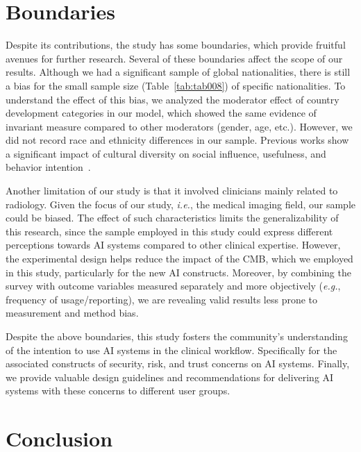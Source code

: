 \section{Boundaries}
\label{sec:chap004007}

Despite its contributions, the study has some boundaries, which provide fruitful avenues for further research.
Several of these boundaries affect the scope of our results.
Although we had a significant sample of global nationalities, there is still a bias for the small sample size (Table~\ref{tab:tab008}) of specific nationalities.
To understand the effect of this bias, we analyzed the moderator effect of country development categories in our model, which showed the same evidence of invariant measure compared to other moderators (gender, age, etc.).
However, we did not record race and ethnicity differences in our sample.
Previous works show a significant impact of cultural diversity on social influence, usefulness, and behavior intention~\cite{Belanche2019, info:doi/10.2196/27122}.

Another limitation of our study is that it involved clinicians mainly related to radiology.
Given the focus of our study, {\it i.e.}, the medical imaging field, our sample could be biased.
The effect of such characteristics limits the generalizability of this research, since the sample employed in this study could express different perceptions towards \ac{AI} systems compared to other clinical expertise.
However, the experimental design helps reduce the impact of the \ac{CMB}, which we employed in this study, particularly for the new \ac{AI} constructs.
Moreover, by combining the survey with outcome variables measured separately and more objectively ({\it e.g.}, frequency of usage/reporting), we are revealing valid results less prone to measurement and method bias.

Despite the above boundaries, this study fosters the community's understanding of the intention to use \ac{AI} systems in the clinical workflow. Specifically for the associated constructs of security, risk, and trust concerns on \ac{AI} systems.
Finally, we provide valuable design guidelines and recommendations for delivering \ac{AI} systems with these concerns to different user groups.

\section{Conclusion}
\label{sec:chap004008}

